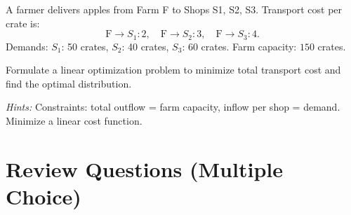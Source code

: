 \documentclass[11pt]{article}
\begin{document}
\begin{problem}
A farmer delivers apples from Farm F to Shops S1, S2, S3. Transport cost per crate is:
\[
\text{F}\to S_1: 2, \quad
\text{F}\to S_2: 3, \quad
\text{F}\to S_3: 4.
\]
Demands: $S_1$: 50 crates, $S_2$: 40 crates, $S_3$: 60 crates. Farm capacity: $150$ crates.

Formulate a linear optimization problem to minimize total transport cost and find the optimal distribution.

\textit{Hints:}  
Constraints: total outflow = farm capacity, inflow per shop = demand. Minimize a linear cost function.
\end{problem}
\section*{Review Questions (Multiple Choice)}
\end{document}
